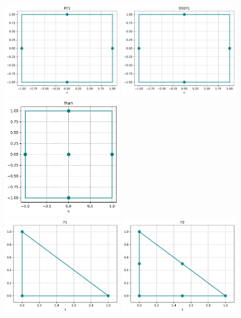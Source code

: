 \begin{center}
\includegraphics[width=5cm]{python_codes/fieldstone_120/spaces/RT1_nodes}
\includegraphics[width=5cm]{python_codes/fieldstone_120/spaces/DSSY1_nodes}
\includegraphics[width=5cm]{python_codes/fieldstone_120/spaces/Han_nodes}\\
\includegraphics[width=5cm]{python_codes/fieldstone_120/spaces/P1_nodes}
\includegraphics[width=5cm]{python_codes/fieldstone_120/spaces/P2_nodes}

\end{center}
